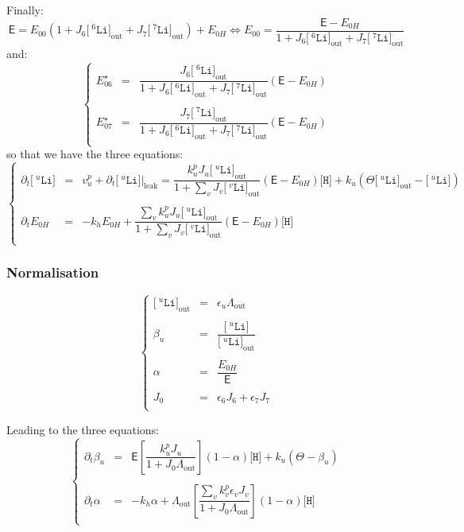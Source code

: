 \documentclass[aps,onecolumn,11pt]{revtex4}
\newcommand{\mychem}[1]{\mathtt{#1}}
\newcommand{\myconc}[1]{\big[#1\big]}
\newcommand{\spLi}[1]{{\!~^{#1}\mychem{Li}}}
\newcommand{\Li}[1]{\myconc{\spLi{#1}}}
\newcommand{\spproton}{\mychem{H}}
\newcommand{\proton}{\myconc{\spproton}}
\newcommand{\myleak}[1]{\left.{#1}\right\vert_{\mathrm{leak}}}
\newcommand{\myout}[1]{{#1}_{\mathrm{out}}}
\newcommand{\LiOut}[1]{\myout{\Li{#1}}}
\newcommand{\LiAll}{\Lambda}
\newcommand{\LiAllOut}{\myout{\LiAll}}
\begin{document}
Finally:
\begin{equation}
\mathsf{E} = E_{00}\left(1+J_6\LiOut{6}+J_7\LiOut{7}\right) + E_{0H} \Leftrightarrow E_{00} = \dfrac{\mathsf{E}-E_{0H}}{1+J_6\LiOut{6}+J_7\LiOut{7}}
\end{equation}
and:
\begin{equation}
\left\lbrace
\begin{array}{rcl}
	E_{06}^\star & = & \dfrac{J_6\LiOut{6}}{1+J_6\LiOut{6}+J_7\LiOut{7}} \left(\mathsf{E}-E_{0H}\right)\\
	\\
	E_{07}^\star & = & \dfrac{J_7\LiOut{7}}{1+J_6\LiOut{6}+J_7\LiOut{7}} \left(\mathsf{E}-E_{0H}\right)\\
\end{array}
\right.
\end{equation}
so that we have the three equations:
\begin{equation}
\left\lbrace
\begin{array}{rcl}
	\partial_t \Li{u}  & = & v^p_u +\partial_t \myleak{\Li{u}}  = \dfrac{k^p_u J_u \LiOut{u}}{1+\sum_v J_v \LiOut{v}} \left(\mathsf{E}-E_{0H}\right) \proton + k_u \left( \Theta \LiOut{u} - \Li{u}\right) \\
	\\
	\partial_t E_{0H} & = & -k_h E_{0H} + \dfrac{\sum_v k^p_u J_u \LiOut{u}}{1+\sum_v J_v \LiOut{v}} \left(\mathsf{E}-E_{0H}\right) \proton \\
\end{array}
\right.
\end{equation}
\subsubsection{Normalisation}
\begin{equation}
\left\lbrace
\begin{array}{rcl}
	\LiOut{u} & = & \epsilon_u \LiAllOut\\
	\\
	\beta_u & = & \dfrac{\Li{u}}{\LiOut{u}}\\
	\\
	\alpha  & = & \dfrac{E_{0H}}{\mathsf{E}}\\
	\\
	J_0 & = & \epsilon_6 J_6  + \epsilon_7 J_7 \\
\end{array}
\right.
\end{equation}

Leading to the three equations:
\begin{equation}
\left\lbrace
\begin{array}{rcl}
	\partial_t \beta_u & = & \mathsf{E} \left[\dfrac{k^p_u J_u}{1+J_0 \LiAllOut}\right] \left(1-\alpha\right) \proton
	 + k_u \left( \Theta - \beta_u\right)\\
	\\
	\partial_t \alpha  & = &  -k_h\alpha + \LiAllOut \left[\dfrac{ \sum_v k^p_v \epsilon_v J_v}{1+J_0\LiAllOut}\right] \left(1-\alpha\right) \proton\\
\end{array}
\right.
\end{equation}
\end{document}
